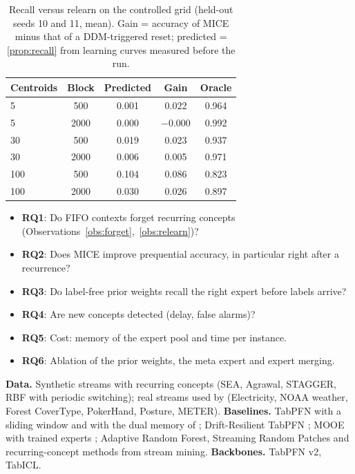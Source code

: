 \documentclass{article}
\theoremstyle{plain}
\theoremstyle{definition}
\theoremstyle{remark}
\newcommand{\method}{\textsc{MICE}}   %
\begin{document}
\begin{table}[t]
  \centering
  \caption{Recall versus relearn on the controlled grid (held-out seeds 10 and 11, mean). Gain = accuracy of \method{}
  minus that of a DDM-triggered reset; predicted = \cref{prop:recall} from learning curves measured before the run.}
  \label{tab:grid}
  \small
  \begin{tabular}{lcccc}
    \toprule
    Centroids & Block & Predicted & Gain & Oracle \\
    \midrule
    5   & 500  & 0.001 & 0.022 & 0.964 \\
    5   & 2000 & 0.000 & $-$0.000 & 0.992 \\
    30  & 500  & 0.019 & 0.023 & 0.937 \\
    30  & 2000 & 0.006 & 0.005 & 0.971 \\
    100 & 500  & 0.104 & 0.086 & 0.823 \\
    100 & 2000 & 0.030 & 0.026 & 0.897 \\
    \bottomrule
  \end{tabular}
\end{table}

\begin{itemize}
  \item \textbf{RQ1}: Do FIFO contexts forget recurring concepts (Observations~\ref{obs:forget},~\ref{obs:relearn})?
  \item \textbf{RQ2}: Does \method{} improve prequential accuracy, in particular right after a recurrence?
  \item \textbf{RQ3}: Do label-free prior weights recall the right expert before labels arrive?
  \item \textbf{RQ4}: Are new concepts detected (delay, false alarms)?
  \item \textbf{RQ5}: Cost: memory of the expert pool and time per instance.
  \item \textbf{RQ6}: Ablation of the prior weights, the meta expert and expert merging.
\end{itemize}
\textbf{Data.} Synthetic streams with recurring concepts (SEA, Agrawal, STAGGER, RBF with periodic switching); real
streams used by \citet{lourenco2026streams} (Electricity, NOAA weather, Forest CoverType, PokerHand, Posture, METER).
\textbf{Baselines.} TabPFN with a sliding window and with the dual memory of \citet{lourenco2026streams};
Drift-Resilient TabPFN \citep{helli2024drift}; MOOE with trained experts \citep{zhao2025mooe}; Adaptive Random Forest,
Streaming Random Patches and recurring-concept methods from stream mining. \textbf{Backbones.} TabPFN v2, TabICL.
\end{document}
